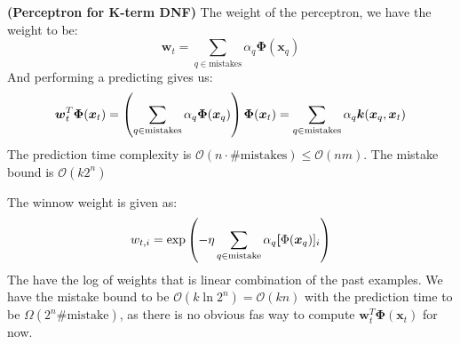 \begin{remark}{\textbf{(Perceptron for K-term DNF)}}
    The weight of the perceptron, we have the weight to be:
    \begin{equation*}
        \boldsymbol w_t = \sum_{q\in\text{mistakes}}\alpha_q \boldsymbol \Phi(\boldsymbol x_q)
    \end{equation*}
    And performing a predicting gives us:
    \begin{equation*}
        \boldsymbol w_t^T\boldsymbol \Phi(\boldsymbol x_t) = \left( \sum_{q\in\text{mistakes}}\alpha_q \boldsymbol \Phi(\boldsymbol x_q) \right)\boldsymbol \Phi(\boldsymbol x_t) = \sum_{q\in\text{mistakes}}\alpha_q \boldsymbol k(\boldsymbol x_q, \boldsymbol x_t)
    \end{equation*}
    The prediction time complexity is $\mathcal{O}(n\cdot\#\text{mistakes}) \le \mathcal{O}(nm)$. The mistake bound is $\mathcal{O}(k2^n)$
\end{remark}

\begin{remark}
    The winnow weight is given as:
    \begin{equation*}
        w_{t, i}=\exp\left( -\eta \sum_{q\in\text{mistake}}\alpha_q\boldsymbol [\Phi(\boldsymbol x_q)]_i \right)
    \end{equation*}
    The have the log of weights that is linear combination of the past examples. We have the mistake bound to be $\mathcal{O}(k\ln 2^n) = \mathcal{O}(kn)$ with the prediction time to be $\Omega(2^n\#\text{mistake})$, as there is no obvious fas way to compute $\boldsymbol w_t^T\boldsymbol \Phi(\boldsymbol x_t)$ for now. 
\end{remark}